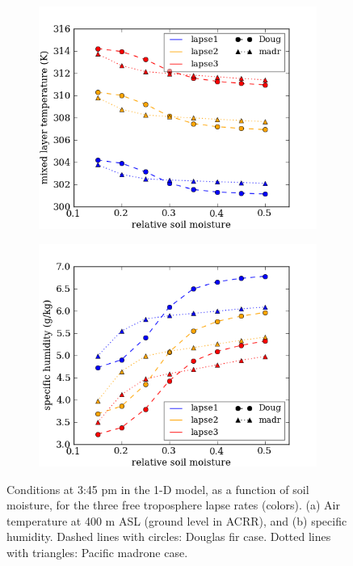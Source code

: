 \begin{figure}[here]
\begin{subfigure}{0.5\textwidth}
\includegraphics[width=\textwidth]{ch2-BL/figures/all_afternoon_T.png}
\caption{}
\end{subfigure}
\begin{subfigure}{0.5\textwidth}
\includegraphics[width=\textwidth]{ch2-BL/figures/all_afternoon_Q.png}
\caption{}
\end{subfigure}
\caption{Conditions at 3:45 pm in the 1-D model, as a function of soil moisture, for the three free troposphere lapse rates (colors).  (a) Air temperature at 400 m ASL (ground level in ACRR), and (b) specific humidity.  Dashed lines with circles: Douglas fir case.  Dotted lines with triangles: Pacific madrone case.}
\label{fig:BL_345changes}
\end{figure}

